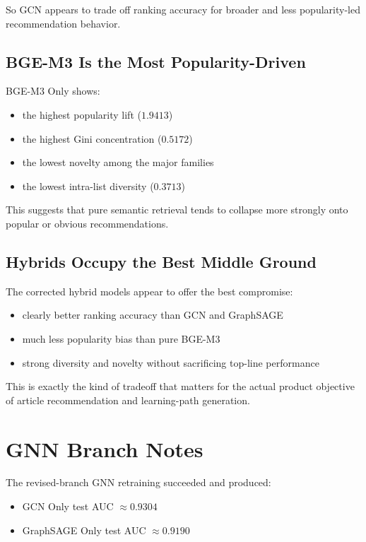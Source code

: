 \documentclass[11pt,a4paper]{article}
\begin{document}
So GCN appears to trade off ranking accuracy for broader and less popularity-led
recommendation behavior.

\subsection{BGE-M3 Is the Most Popularity-Driven}
BGE-M3 Only shows:

\begin{itemize}
    \item the highest popularity lift ($1.9413$)
    \item the highest Gini concentration ($0.5172$)
    \item the lowest novelty among the major families
    \item the lowest intra-list diversity ($0.3713$)
\end{itemize}

This suggests that pure semantic retrieval tends to collapse more strongly onto
popular or obvious recommendations.

\subsection{Hybrids Occupy the Best Middle Ground}
The corrected hybrid models appear to offer the best compromise:

\begin{itemize}
    \item clearly better ranking accuracy than GCN and GraphSAGE
    \item much less popularity bias than pure BGE-M3
    \item strong diversity and novelty without sacrificing top-line performance
\end{itemize}

This is exactly the kind of tradeoff that matters for the actual product
objective of article recommendation and learning-path generation.

\section{GNN Branch Notes}
The revised-branch GNN retraining succeeded and produced:

\begin{itemize}
    \item GCN Only test AUC $\approx 0.9304$
    \item GraphSAGE Only test AUC $\approx 0.9190$
\end{itemize}
\end{document}
